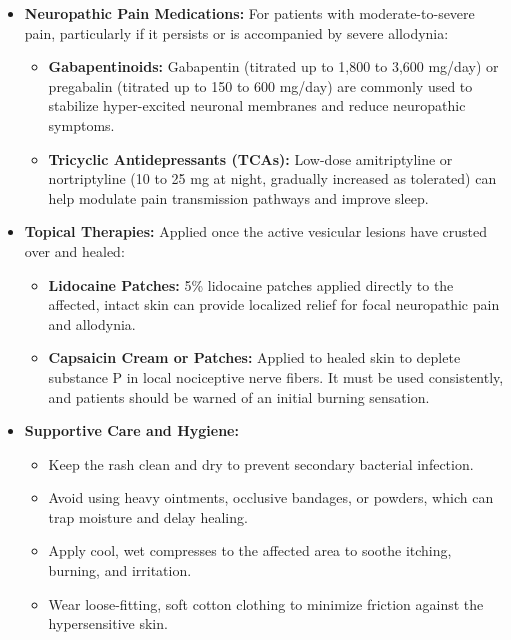 \begin{itemize}
\begin{itemize}
        \item \textbf{Opioid Analgesics:} Short-term use of moderate-to-strong oral opioids (e.g., tramadol, oxycodone) may be required for patients experiencing severe acute pain that impairs sleep and daily functioning.
        \item \textbf{Systemic Corticosteroids:} Oral prednisone (e.g., 40 to 60 mg daily, tapered over 2 to 3 weeks) can be used as an adjunct to antiviral therapy in older, immunocompetent patients with severe pain or cranial nerve involvement. Corticosteroids accelerate skin healing and reduce acute pain, but they do not decrease the long-term incidence or severity of postherpetic neuralgia.
    \end{itemize}
    \item \textbf{Neuropathic Pain Medications:} For patients with moderate-to-severe pain, particularly if it persists or is accompanied by severe allodynia:
    \begin{itemize}
        \item \textbf{Gabapentinoids:} Gabapentin (titrated up to 1,800 to 3,600 mg/day) or pregabalin (titrated up to 150 to 600 mg/day) are commonly used to stabilize hyper-excited neuronal membranes and reduce neuropathic symptoms.
        \item \textbf{Tricyclic Antidepressants (TCAs):} Low-dose amitriptyline or nortriptyline (10 to 25 mg at night, gradually increased as tolerated) can help modulate pain transmission pathways and improve sleep.
    \end{itemize}
    \item \textbf{Topical Therapies:} Applied once the active vesicular lesions have crusted over and healed:
    \begin{itemize}
        \item \textbf{Lidocaine Patches:} 5\% lidocaine patches applied directly to the affected, intact skin can provide localized relief for focal neuropathic pain and allodynia.
        \item \textbf{Capsaicin Cream or Patches:} Applied to healed skin to deplete substance P in local nociceptive nerve fibers. It must be used consistently, and patients should be warned of an initial burning sensation.
    \end{itemize}
    \item \textbf{Supportive Care and Hygiene:}
    \begin{itemize}
        \item Keep the rash clean and dry to prevent secondary bacterial infection.
        \item Avoid using heavy ointments, occlusive bandages, or powders, which can trap moisture and delay healing.
        \item Apply cool, wet compresses to the affected area to soothe itching, burning, and irritation.
        \item Wear loose-fitting, soft cotton clothing to minimize friction against the hypersensitive skin.
    \end{itemize}
\end{itemize}

